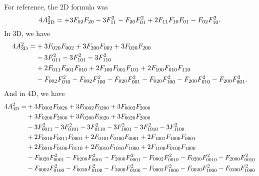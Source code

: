 \documentclass[12pt]{article}
\begin{document}
For reference, the 2D formula was
\begin{equation}
4 A_{\rm 2D}^2 = +3 F_{02} F_{20} -3 F_{11}^2 - F_{20} F_{01}^2 +2 F_{11} F_{10} F_{01} - F_{02} F_{10}^2.
\end{equation}
In 3D, we have
\begin{equation}
\begin{aligned}
4 A_{\rm 3D}^2 = &
+3 F_{020} F_{002} 
+3 F_{200} F_{002} 
+3 F_{020} F_{200} \\&
-3 F_{011}^2 
-3 F_{101}^2 
-3 F_{110}^2 \\&
+2 F_{011} F_{001} F_{010} 
+2 F_{100} F_{001} F_{101}
+2 F_{100} F_{010} F_{110} \\&
-F_{002} F_{010}^2 
-F_{002} F_{100}^2 
-F_{020} F_{001}^2 
-F_{020} F_{100}^2
-F_{200} F_{010}^2
-F_{200} F_{001}^2. 
\end{aligned}
\end{equation}
And in 4D, we have
\begin{equation}
\begin{aligned}
4 A_{\rm 4D}^2 = &
+3 F_{0002} F_{0020} 
+3 F_{0002} F_{0200} 
+3 F_{0002} F_{2000} 
\\&
+3 F_{0200} F_{2000} 
+3 F_{0200} F_{0020} 
+3 F_{0020} F_{2000} 
\\&
-3 F_{0011}^2
-3 F_{0101}^2
-3 F_{0110}^2
-3 F_{1001}^2 
-3 F_{1010}^2 
-3 F_{1100}^2
\\&
+2 F_{0010} F_{0011} F_{0001} 
+2 F_{0101} F_{0100} F_{0001} 
+2 F_{1001} F_{1000} F_{0001}
\\&
+2 F_{0010} F_{0100} F_{0110} 
+2 F_{0010} F_{1010} F_{1000}
+2 F_{1100} F_{0100} F_{1000} 
\\&
- F_{0020} F_{0001}^2
- F_{0200} F_{0001}^2
- F_{2000} F_{0001}^2
- F_{0002} F_{0010}^2
- F_{0200} F_{0010}^2
- F_{2000} F_{0010}^2
\\&
- F_{0002} F_{0100}^2 
- F_{0020} F_{0100}^2 
- F_{2000} F_{0100}^2
- F_{0002} F_{1000}^2 
- F_{0020} F_{1000}^2 
- F_{0200} F_{1000}^2
\end{aligned}
\end{equation}

\newpage
{\small\singlespacing}
\end{document}

